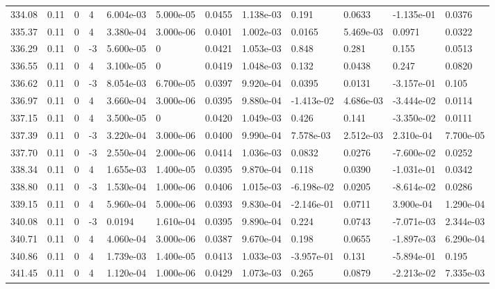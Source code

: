 \documentclass[preview]{standalone}
\begin{document}
{{{{{{{{{{{{{{{{\begin{tabular}{L{1.2cm}C{1.2cm} C{0.3cm}C{0.5cm} C{1.4cm}C{1.4cm} C{1.4cm}C{1.4cm} C{1.6cm}C{1.6cm} C{1.6cm}C{1.6cm}}
  334.08  &  0.11  & 0     &  4 &  6.004e-03  & 5.000e-05  &  0.0455&   1.138e-03& 0.191 & 0.0633   &  -1.135e-01 & 0.0376  \\ 
  335.37  &  0.11  & 0     &  4 &  3.380e-04  & 3.000e-06  &  0.0401&   1.002e-03& 0.0165 & 5.469e-03   &  0.0971 & 0.0322  \\ 
  336.29  &  0.11  & 0     & -3 &  5.600e-05  & 0  &  0.0421&   1.053e-03& 0.848 & 0.281   &  0.155 & 0.0513  \\ 
  336.55  &  0.11  & 0     &  4 &  3.100e-05  & 0  &  0.0419&   1.048e-03& 0.132 & 0.0438   &  0.247 & 0.0820  \\ 
  336.62  &  0.11  & 0     & -3 &  8.054e-03  & 6.700e-05  &  0.0397&   9.920e-04& 0.0395 & 0.0131   &  -3.157e-01 & 0.105  \\ 
  336.97  &  0.11  & 0     &  4 &  3.660e-04  & 3.000e-06  &  0.0395&   9.880e-04& -1.413e-02 & 4.686e-03   &  -3.444e-02 & 0.0114  \\ 
  337.15  &  0.11  & 0     &  4 &  3.500e-05  & 0  &  0.0420&   1.049e-03& 0.426 & 0.141   &  -3.350e-02 & 0.0111  \\ 
  337.39  &  0.11  & 0     & -3 &  3.220e-04  & 3.000e-06  &  0.0400&   9.990e-04& 7.578e-03 & 2.512e-03   &  2.310e-04 & 7.700e-05  \\ 
  337.70  &  0.11  & 0     & -3 &  2.550e-04  & 2.000e-06  &  0.0414&   1.036e-03& 0.0832 & 0.0276   &  -7.600e-02 & 0.0252  \\ 
  338.34  &  0.11  & 0     &  4 &  1.655e-03  & 1.400e-05  &  0.0395&   9.870e-04& 0.118 & 0.0390   &  -1.031e-01 & 0.0342  \\ 
  338.80  &  0.11  & 0     & -3 &  1.530e-04  & 1.000e-06  &  0.0406&   1.015e-03& -6.198e-02 & 0.0205   &  -8.614e-02 & 0.0286  \\ 
  339.15  &  0.11  & 0     &  4 &  5.960e-04  & 5.000e-06  &  0.0393&   9.830e-04& -2.146e-01 & 0.0711   &  3.900e-04 & 1.290e-04  \\ 
  340.08  &  0.11  & 0     & -3 &  0.0194  & 1.610e-04  &  0.0395&   9.890e-04& 0.224 & 0.0743   &  -7.071e-03 & 2.344e-03  \\ 
  340.71  &  0.11  & 0     &  4 &  4.060e-04  & 3.000e-06  &  0.0387&   9.670e-04& 0.198 & 0.0655   &  -1.897e-03 & 6.290e-04  \\ 
  340.86  &  0.11  & 0     &  4 &  1.739e-03  & 1.400e-05  &  0.0413&   1.033e-03& -3.957e-01 & 0.131   &  -5.894e-01 & 0.195  \\ 
  341.45  &  0.11  & 0     &  4 &  1.120e-04  & 1.000e-06  &  0.0429&   1.073e-03& 0.265 & 0.0879   &  -2.213e-02 & 7.335e-03  \\ 

\end{tabular}}}}}}}}}}}}}}}}}
\end{document}
